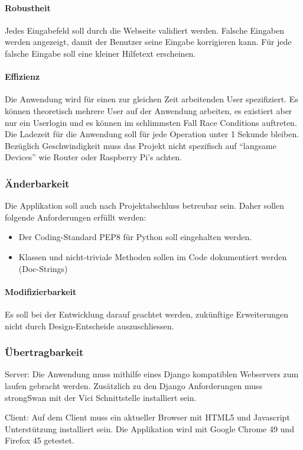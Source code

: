 \paragraph{Robustheit}
Jedes Eingabefeld soll durch die Webseite validiert werden. Falsche Eingaben werden angezeigt, damit der Benutzer seine Eingabe korrigieren kann. Für jede falsche Eingabe soll eine kleiner Hilfetext erscheinen.

\paragraph{Effizienz}
Die Anwendung wird für einen zur gleichen Zeit arbeitenden User spezifiziert. Es können theoretisch mehrere User auf der Anwendung arbeiten, es existiert aber nur ein Userlogin und es können im schlimmsten Fall Race Conditions auftreten.
Die Ladezeit für die Anwendung soll für jede Operation unter 1 Sekunde bleiben. Bezüglich Geschwindigkeit muss das Projekt nicht spezifisch auf “langsame Devices” wie Router oder Raspberry Pi's achten.

\subsubsection{Änderbarkeit}
Die Applikation soll auch nach Projektabschluss betreubar sein. Daher sollen folgende Anforderungen erfüllt werden: 
\begin{itemize}
	\item Der Coding-Standard PEP8 für Python soll eingehalten werden.
	\item Klassen und nicht-triviale Methoden sollen im Code dokumentiert werden (Doc-Strings)
\end{itemize}

\paragraph{Modifizierbarkeit}
Es soll bei der Entwicklung darauf geachtet werden, zukünftige Erweiterungen nicht durch Design-Entscheide auszuschliessen.


\subsubsection{Übertragbarkeit}
Server: Die Anwendung muss mithilfe eines Django kompatiblen Webservers zum laufen gebracht werden. Zusätzlich zu den Django Anforderungen muss strongSwan mit der Vici Schnittstelle installiert sein.

Client: Auf dem Client muss ein aktueller Browser mit HTML5 und Javascript Unterstützung installiert sein. Die Applikation wird mit Google Chrome 49 und Firefox 45 getestet.


